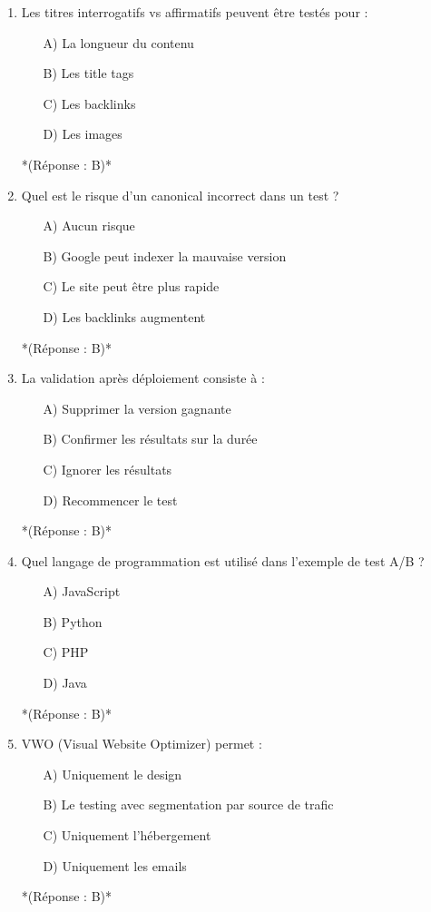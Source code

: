 \documentclass[12pt,a4paper,twoside]{report}
\begin{document}
\begin{enumerate}
    \item Les titres interrogatifs vs affirmatifs peuvent être testés pour :
    \begin{itemize}
        \item[A)] La longueur du contenu
        \item[B)] Les title tags
        \item[C)] Les backlinks
        \item[D)] Les images
    \end{itemize}
    *(Réponse : B)*

    \item Quel est le risque d'un canonical incorrect dans un test ?
    \begin{itemize}
        \item[A)] Aucun risque
        \item[B)] Google peut indexer la mauvaise version
        \item[C)] Le site peut être plus rapide
        \item[D)] Les backlinks augmentent
    \end{itemize}
    *(Réponse : B)*

    \item La validation après déploiement consiste à :
    \begin{itemize}
        \item[A)] Supprimer la version gagnante
        \item[B)] Confirmer les résultats sur la durée
        \item[C)] Ignorer les résultats
        \item[D)] Recommencer le test
    \end{itemize}
    *(Réponse : B)*

    \item Quel langage de programmation est utilisé dans l'exemple de test A/B ?
    \begin{itemize}
        \item[A)] JavaScript
        \item[B)] Python
        \item[C)] PHP
        \item[D)] Java
    \end{itemize}
    *(Réponse : B)*

    \item VWO (Visual Website Optimizer) permet :
    \begin{itemize}
        \item[A)] Uniquement le design
        \item[B)] Le testing avec segmentation par source de trafic
        \item[C)] Uniquement l'hébergement
        \item[D)] Uniquement les emails
    \end{itemize}
    *(Réponse : B)*


\end{enumerate}
\end{document}
